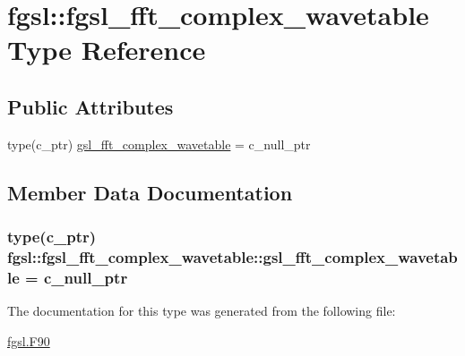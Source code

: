 \hypertarget{structfgsl_1_1fgsl__fft__complex__wavetable}{}\section{fgsl\+:\+:fgsl\+\_\+fft\+\_\+complex\+\_\+wavetable Type Reference}
\label{structfgsl_1_1fgsl__fft__complex__wavetable}
\subsection*{Public Attributes}
\begin{DoxyCompactItemize}
\item 
type(c\+\_\+ptr) \hyperlink{structfgsl_1_1fgsl__fft__complex__wavetable_afb4fa615365958d5ee789a7702992108}{gsl\+\_\+fft\+\_\+complex\+\_\+wavetable} = c\+\_\+null\+\_\+ptr
\end{DoxyCompactItemize}


\subsection{Member Data Documentation}
\hypertarget{structfgsl_1_1fgsl__fft__complex__wavetable_afb4fa615365958d5ee789a7702992108}{}
\subsubsection[{gsl\+\_\+fft\+\_\+complex\+\_\+wavetable}]{\setlength{\rightskip}{0pt plus 5cm}type(c\+\_\+ptr) fgsl\+::fgsl\+\_\+fft\+\_\+complex\+\_\+wavetable\+::gsl\+\_\+fft\+\_\+complex\+\_\+wavetable = c\+\_\+null\+\_\+ptr}\label{structfgsl_1_1fgsl__fft__complex__wavetable_afb4fa615365958d5ee789a7702992108}


The documentation for this type was generated from the following file\+:\begin{DoxyCompactItemize}
\item 
\hyperlink{fgsl_8F90}{fgsl.\+F90}\end{DoxyCompactItemize}

